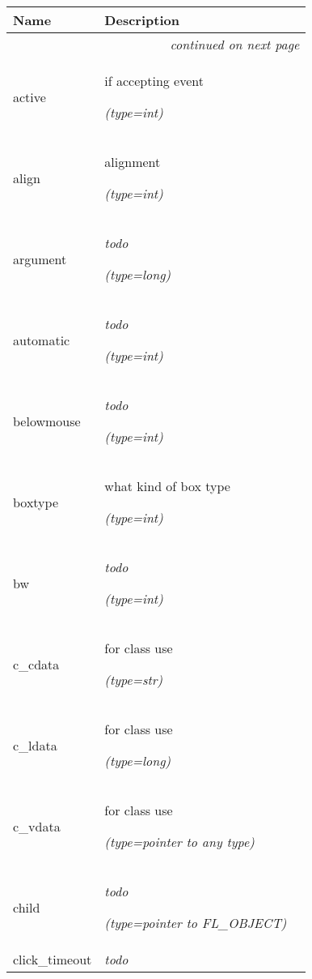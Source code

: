     \vspace{-1cm}
\hspace{\varindent}\begin{longtable}{|p{\varnamewidth}|p{\vardescrwidth}|l}
\cline{1-2}
\cline{1-2} \centering \textbf{Name} & \centering \textbf{Description}& \\
\cline{1-2}
\endhead\cline{1-2}\multicolumn{3}{r}{\small\textit{continued on next page}}\\\endfoot\cline{1-2}
\endlastfoot\raggedright a\-c\-t\-i\-v\-e\- & \raggedright if accepting event

            {\it (type=int)}&\\
\cline{1-2}
\raggedright a\-l\-i\-g\-n\- & \raggedright alignment

            {\it (type=int)}&\\
\cline{1-2}
\raggedright a\-r\-g\-u\-m\-e\-n\-t\- & \raggedright \emph{todo}

            {\it (type=long)}&\\
\cline{1-2}
\raggedright a\-u\-t\-o\-m\-a\-t\-i\-c\- & \raggedright \emph{todo}

            {\it (type=int)}&\\
\cline{1-2}
\raggedright b\-e\-l\-o\-w\-m\-o\-u\-s\-e\- & \raggedright \emph{todo}

            {\it (type=int)}&\\
\cline{1-2}
\raggedright b\-o\-x\-t\-y\-p\-e\- & \raggedright what kind of box type

            {\it (type=int)}&\\
\cline{1-2}
\raggedright b\-w\- & \raggedright \emph{todo}

            {\it (type=int)}&\\
\cline{1-2}
\raggedright c\-\_\-c\-d\-a\-t\-a\- & \raggedright for class use

            {\it (type=str)}&\\
\cline{1-2}
\raggedright c\-\_\-l\-d\-a\-t\-a\- & \raggedright for class use

            {\it (type=long)}&\\
\cline{1-2}
\raggedright c\-\_\-v\-d\-a\-t\-a\- & \raggedright for class use

            {\it (type=pointer to any type)}&\\
\cline{1-2}
\raggedright c\-h\-i\-l\-d\- & \raggedright \emph{todo}

            {\it (type=pointer to FL\_OBJECT)}&\\
\cline{1-2}
\raggedright c\-l\-i\-c\-k\-\_\-t\-i\-m\-e\-o\-u\-t\- & \raggedright \emph{todo}


\end{longtable}

